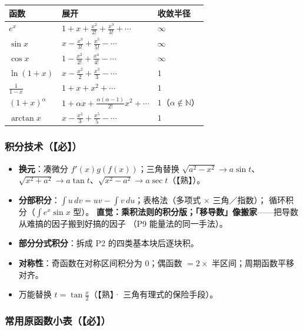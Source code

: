 \begin{center}
\begin{tabular}{lll}
\toprule
\textbf{函数} & \textbf{展开} & \textbf{收敛半径} \\
\midrule
$e^x$ & $1+x+\frac{x^2}{2!}+\frac{x^3}{3!}+\cdots$ & $\infty$ \\
$\sin x$ & $x-\frac{x^3}{3!}+\frac{x^5}{5!}-\cdots$ & $\infty$ \\
$\cos x$ & $1-\frac{x^2}{2!}+\frac{x^4}{4!}-\cdots$ & $\infty$ \\
$\ln(1+x)$ & $x-\frac{x^2}{2}+\frac{x^3}{3}-\cdots$ & $1$ \\
$\frac{1}{1-x}$ & $1+x+x^2+\cdots$ & $1$ \\
$(1+x)^\alpha$ & $1+\alpha x+\frac{\alpha(\alpha-1)}{2!}x^2+\cdots$ & $1$（$\alpha\notin\mathbb N$） \\
$\arctan x$ & $x-\frac{x^3}{3}+\frac{x^5}{5}-\cdots$ & $1$ \\
\bottomrule
\end{tabular}
\end{center}

\subsubsection{积分技术（【必】）}

\begin{itemize}
  \item \textbf{换元}：凑微分 $f'(x)g(f(x))$；三角替换 $\sqrt{a^2-x^2}\to a\sin t$、
        $\sqrt{x^2+a^2}\to a\tan t$、$\sqrt{x^2-a^2}\to a\sec t$（【熟】）。
  \item \textbf{分部积分}：$\int u\,dv=uv-\int v\,du$；表格法（多项式 $\times$ 三角／指数）；
        循环积分（$\int e^x\sin x$ 型）。
        \textbf{直觉：乘积法则的积分版；「移导数」像搬家}——把导数从难搞的因子搬到好搞的因子
        （P9 能量法的同一手法）。
  \item \textbf{部分分式积分}：拆成 P2 的四类基本块后逐块积。
  \item \textbf{对称性}：奇函数在对称区间积分为 $0$；偶函数 $=2\times$ 半区间；周期函数平移对齐。
  \item 万能替换 $t=\tan\frac x2$（【熟】· 三角有理式的保险手段）。
\end{itemize}

\subsubsection{常用原函数小表（【必】）}

